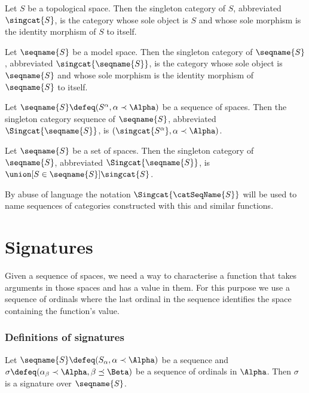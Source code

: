 \documentclass{article}
\begin{document}
\begin{definition}
\label {def:singcat}
Let $S$ be a topological space. Then the singleton category of $S$,
abbreviated $\singcat{S}$, is the category whose sole object is $S$ and
whose sole morphism is the identity morphism of $S$ to itself.

Let $\seqname{S}$ be a model space. Then the singleton category of
$\seqname{S}$, abbreviated $\singcat{\seqname{S}}$, is the category whose
sole object is $\seqname{S}$ and whose sole morphism is the identity
morphism of $\seqname{S}$ to itself.

Let $\seqname{S} \defeq (S^\alpha, \alpha \prec \Alpha)$ be a sequence
of spaces. Then the singleton category sequence of $\seqname{S}$,
abbreviated $\Singcat{\seqname{S}}$, is
$(\singcat{S^\alpha}, \alpha \prec \Alpha)$.

Let $\seqname{S}$ be a set of spaces. Then the singleton category of
$\seqname{S}$, abbreviated $\Singcat{\seqname{S}}$, is
$\union[S \in \seqname{S}]{\singcat{S}}$.

\begin{remark}
By abuse of language the notation $\Singcat{\catSeqName{S}}$ will be used
to name sequences of categories constructed with this and similar
functions.
\end{remark}
\end{definition}

%

\part{Signatures}
\label{part:sig}
Given a sequence of spaces, we need a way to characterise a function
that takes arguments in those spaces and has a value in them. For this
purpose we use a sequence of ordinals where the last ordinal in the
sequence identifies the space containing the function's value.

\section{Definitions of signatures}
\begin{definition}[Signature]
Let $\seqname{S} \defeq (S_\alpha, \alpha \prec \Alpha)$ be a sequence
and $\sigma \defeq (\alpha_\beta \prec \Alpha, \beta \preceq \Beta)$ be
a sequence of ordinals in $\Alpha$. Then $\sigma$ is a signature over
$\seqname{S}$.
\end{definition}
\end{document}
